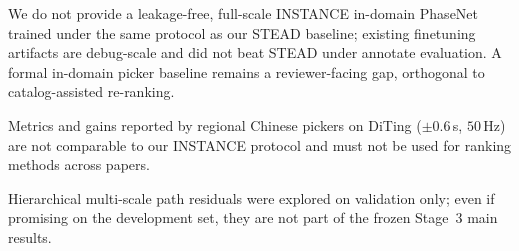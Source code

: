 
\item We do not provide a leakage-free, full-scale INSTANCE in-domain PhaseNet
trained under the same protocol as our STEAD baseline; existing finetuning
artifacts are debug-scale and did not beat STEAD under annotate evaluation.
A formal in-domain picker baseline remains a reviewer-facing gap, orthogonal to
catalog-assisted re-ranking.
\item Metrics and gains reported by regional Chinese pickers on DiTing
($\pm 0.6$\,s, $50$\,Hz) are not comparable to our INSTANCE protocol and must
not be used for ranking methods across papers.
\item Hierarchical multi-scale path residuals were explored on validation only;
even if promising on the development set, they are not part of the frozen
Stage~3 main results.

